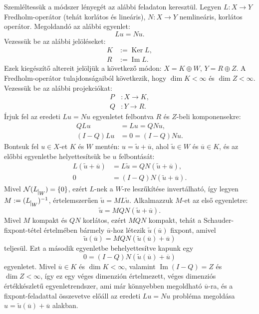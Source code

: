 \documentclass[oneside, titlepage, 12pt, a4paper]{report}
\DeclareMathOperator{\Ima}{Im}	%
\DeclareMathOperator{\Ker}{Ker}	%
\begin{document}
Szemléltessük a módszer lényegét az alábbi feladaton keresztül. Legyen $L : X \rightarrow Y$ Fredholm-operátor (tehát korlátos és lineáris), $N : X \rightarrow Y$ nemlineáris, korlátos operátor.
Megoldandó az alábbi egyenlet:
\begin{equation*}
Lu = Nu.
\end{equation*}
Vezessük be az alábbi jelöléseket:
\begin{align*}
K &:= \Ker L, \\
R &:= \Ima L.
\end{align*}
Ezek kiegészítő altereit jelöljük a következő módon: $X = K \oplus W$, $Y = R \oplus Z$. A Fredholm-operátor tulajdonságaiból következik, hogy $\dim K < \infty$ és $\dim Z < \infty$. Vezessük be az alábbi projekciókat:
\begin{align*}
P &: X \rightarrow K, \\
Q &: Y \rightarrow R.
\end{align*}
Írjuk fel az eredeti $Lu = Nu$ egyenletet felbontva $R$ és $Z$-beli komponensekre:
\begin{align*}
Q L u &= L u = Q N u, \\
(I - Q) L u &= 0 = (I - Q) N u.
\end{align*}
Bontsuk fel $u \in X$-et $K$ és $W$ mentén: $u = \widetilde{u} + \overline{u}$, ahol $\widetilde{u} \in W$ és $\overline{u} \in K$, és az előbbi egyenletbe helyettesítsük be $u$ felbontását:
\begin{align*}
L (\widetilde{u} + \overline{u}) &= L \widetilde{u} = Q N (\widetilde{u} + \overline{u}), \\
0 &= (I - Q) N (\widetilde{u} + \overline{u}).
\end{align*}
Mivel $\mathcal{N}( L_{\mkern 1mu \vrule height 2ex\mkern2mu W}) = \{ 0 \}$, ezért $L$-nek a $W$-re leszűkítése invertálható, így legyen $M := (L_{\mkern 1mu \vrule height 2ex\mkern2mu W})^{-1}$, értelemszerűen $\widetilde{u} = M L \widetilde{u}$. Alkalmazzuk $M$-et az első egyenletre:
\begin{equation*}
\widetilde{u} = M Q N (\widetilde{u} + \overline{u}).
\end{equation*}
Mivel $M$ kompakt és $QN$ korlátos, ezért $MQN$ kompakt, tehát a Schauder-fixpont-tétel értelmében bármely $\overline{u}$-hoz létezik $\widetilde{u}(\overline{u})$ fixpont, amivel
\begin{equation*}
\widetilde{u}(\overline{u}) = M Q N (\widetilde{u}(\overline{u}) + \overline{u})
\end{equation*}
teljesül. Ezt a második egyenletbe behelyettesítve kapunk egy
\begin{equation*}
0 = (I - Q) N (\widetilde{u}(\overline{u}) + \overline{u})
\end{equation*}
egyenletet. Mivel $\overline{u} \in K$ és $\dim K < \infty$, valamint $\Ima (I - Q) = Z$ és $\dim Z < \infty$, így ez egy véges dimenzión értelmezett, véges dimenziós értékkészletű egyenletrendszer, ami már könnyebben megoldható $\overline{u}$-ra, és a fixpont-feladattal összevetve előáll az eredeti $Lu = Nu$ probléma megoldása $u = \widetilde{u}(\overline{u}) + \overline{u}$ alakban.
\end{document}
